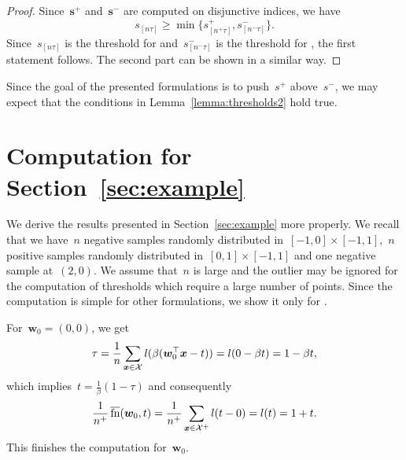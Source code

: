 \begin{proof}
  Since~$\bm{s}^+$ and~$\bm{s}^-$ are computed on disjunctive indices, we have
  \begin{equation*}
    s_{[n\tau]} \ge \min\{s_{[n^+\tau]}^+, s_{[n^-\tau]}^-\}.
  \end{equation*}
  Since~$s_{[n\tau]}$ is the threshold for \Grill and~$s_{[n^-\tau]}^-$ is the threshold for \GrillNP, the first statement follows. The second part can be shown in a similar way.
\end{proof}
  
\noindent Since the goal of the presented formulations is to push~$s^+$ above~$s^-$, we may expect that the conditions in Lemma~\ref{lemma:thresholds2} hold true. 
  
\section{Computation for Section~\ref{sec:example}}\label{app:example}

We derive the results presented in Section~\ref{sec:example} more properly. We recall that we have~$n$ negative samples randomly distributed in~$[-1,0]\times[-1,1]$,~$n$ positive samples randomly distributed in~$[0,1]\times[-1,1]$ and one negative sample at~$(2,0)$. We assume that~$n$ is large and the outlier may be ignored for the computation of thresholds which require a large number of points. Since the computation is simple for other formulations, we show it only for \PatMat.
  
For~$\bm{w}_0=(0,0)$, we get
\begin{equation*}
  \tau
  = \frac{1}{n}\sum_{\bm{x} \in \mathcal{X}}l(\beta(\bm{w}_0^\top \bm{x}-t))
  = l(0-\beta t) = 1-\beta t,
\end{equation*}
which implies~$t=\frac{1}{\beta}(1-\tau)$ and consequently
\begin{equation*}
  \frac{1}{n^+}\operatorname{\overline{fn}}(\bm{w}_0,t)
  = \frac{1}{n^+}\sum_{\bm{x} \in \mathcal{X}^+} l(t-0)
  = l(t) = 1+t.
\end{equation*}
This finishes the computation for~$\bm{w}_0$.


